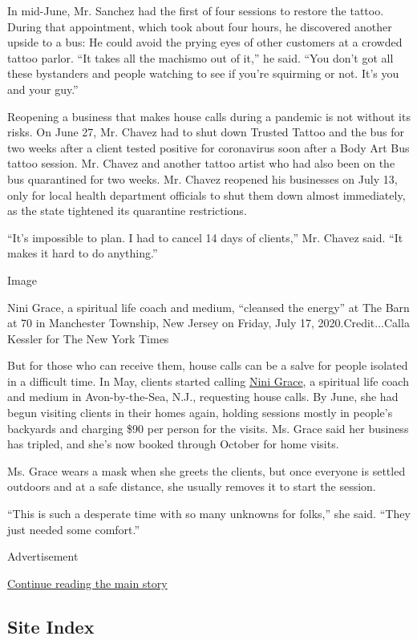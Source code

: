 In mid-June, Mr. Sanchez had the first of four sessions to restore the
tattoo. During that appointment, which took about four hours, he
discovered another upside to a bus: He could avoid the prying eyes of
other customers at a crowded tattoo parlor. ``It takes all the machismo
out of it,'' he said. ``You don't got all these bystanders and people
watching to see if you're squirming or not. It's you and your guy.''

Reopening a business that makes house calls during a pandemic is not
without its risks. On June 27, Mr. Chavez had to shut down Trusted
Tattoo and the bus for two weeks after a client tested positive for
coronavirus soon after a Body Art Bus tattoo session. Mr. Chavez and
another tattoo artist who had also been on the bus quarantined for two
weeks. Mr. Chavez reopened his businesses on July 13, only for local
health department officials to shut them down almost immediately, as the
state tightened its quarantine restrictions.

``It's impossible to plan. I had to cancel 14 days of clients,'' Mr.
Chavez said. ``It makes it hard to do anything.''

Image

Nini Grace, a spiritual life coach and medium, ``cleansed the energy''
at The Barn at 70 in Manchester Township, New Jersey on Friday, July 17,
2020.Credit...Calla Kessler for The New York Times

But for those who can receive them, house calls can be a salve for
people isolated in a difficult time. In May, clients started calling
\href{http://theenlightenmentcntr.com/nini}{Nini Grace}, a spiritual
life coach and medium in Avon-by-the-Sea, N.J., requesting house calls.
By June, she had begun visiting clients in their homes again, holding
sessions mostly in people's backyards and charging \$90 per person for
the visits. Ms. Grace said her business has tripled, and she's now
booked through October for home visits.

Ms. Grace wears a mask when she greets the clients, but once everyone is
settled outdoors and at a safe distance, she usually removes it to start
the session.

``This is such a desperate time with so many unknowns for folks,'' she
said. ``They just needed some comfort.''

Advertisement

\protect\hyperlink{after-bottom}{Continue reading the main story}

\hypertarget{site-index}{%
\subsection{Site Index}\label{site-index}}

